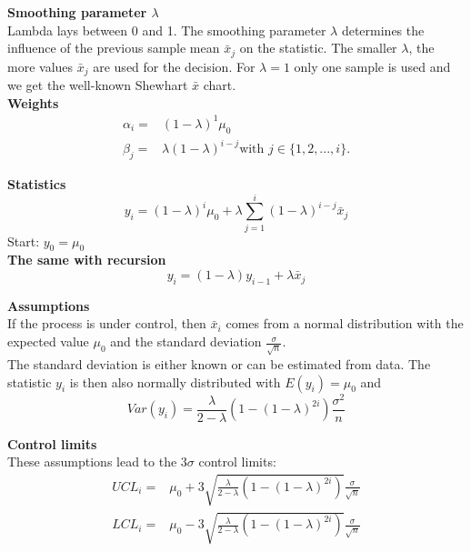 \textbf{Smoothing parameter $\lambda$}\\
Lambda lays between 0 and 1. The smoothing parameter $\lambda$ determines the influence of the previous sample mean $\bar{x}_j$ on the statistic. The smaller $\lambda$, the more values $\bar{x}_j$ are used for the decision. For $\lambda = 1$ only one sample is used and we get the well-known Shewhart $\bar{x}$ chart.\\

\textbf{Weights}\\
\begin{equation}
  \begin{split}
    \alpha_i =& (1-\lambda)^1 \mu_0\\
    \beta_j =& \lambda(1-\lambda)^{i-j} \text{with } j \in \{1,2,...,i\}.
  \end{split}
\end{equation}

\textbf{Statistics}\\
\begin{equation}
  y_i = (1-\lambda)^i \mu_0 + \lambda \sum_{j=1}^i(1-\lambda)^{i-j}\bar{x}_j
\end{equation}
Start: $y_0 = \mu_0$\\

\textbf{The same with recursion}\\
\begin{equation}
  y_i = (1-\lambda)y_{i-1} + \lambda\bar{x}_j
\end{equation}

\textbf{Assumptions}\\
If the process is under control, then $\bar{x}_i$ comes from a normal distribution with the expected value $\mu_0$ and the standard deviation $\frac{\sigma}{\sqrt{n}}$.\\
The standard deviation is either known or can be estimated from data. The statistic $y_i$ is then also normally distributed with $E(y_i) = \mu_0$ and
\begin{equation}
  Var(y_i) = \frac{\lambda}{2-\lambda}(1-(1-\lambda)^{2i})\frac{\sigma^2}{n}
\end{equation}

\textbf{Control limits}\\
These assumptions lead to the $3\sigma$ control limits:
\begin{equation}
  \begin{split}
    UCL_i =& \mu_0 + 3 \sqrt{\frac{\lambda}{2-\lambda}\left(1-(1-\lambda)^{2i}\right)}\frac{\sigma}{\sqrt{n}}\\
    LCL_i =& \mu_0 - 3 \sqrt{\frac{\lambda}{2-\lambda}\left(1-(1-\lambda)^{2i}\right)}\frac{\sigma}{\sqrt{n}}
  \end{split}
\end{equation}

